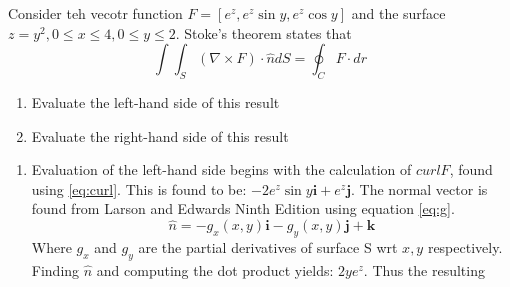Consider teh vecotr function $F=[e^z,e^z\sin y, e^z \cos y]$ and the surface $z=y^2, 0\leq x\leq4, 0\leq y\leq2$. Stoke's theorem states that
	\begin{equation*}
		\int\int_S\left(\nabla\times F\right)\cdot\hat{n}dS=\oint_C F\cdot dr
	\end{equation*}
	
	\begin{enumerate}
		\item Evaluate the left-hand side of this result
		\item Evaluate the right-hand side of this result
	\end{enumerate}

	\begin{enumerate}
		\item Evaluation of the left-hand side begins with the calculation of $curl F$, found using \ref{eq:curl}. This is found to be: $-2e^z\sin y \boldsymbol{i}+e^z\boldsymbol{j}$. The normal vector is found from Larson and Edwards Ninth Edition using equation \ref{eq:g}.
		\begin{equation}
			\hat{n}=-g_x(x,y)\boldsymbol{i}-g_y(x,y)\boldsymbol{j}+\boldsymbol{k}
			\label{eq:g}
		\end{equation}
	Where $g_x$ and $g_y$ are the partial derivatives of surface S wrt $x,y$ respectively. Finding $\hat{n}$ and computing the dot product yields: $2ye^z$. Thus the resulting 
\end{enumerate}